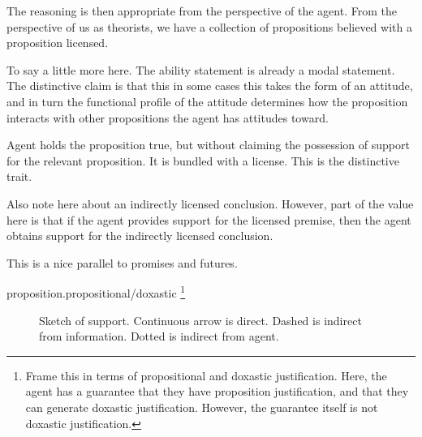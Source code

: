 \documentclass[10pt]{article}
\begin{document}
The reasoning is then appropriate from the perspective of the agent.
From the perspective of us as theorists, we have a collection of propositions believed with a proposition licensed.


To say a little more here.
The ability statement is already a modal statement.
The distinctive claim is that this in some cases this takes the form of an attitude, and in turn the functional profile of the attitude determines how the proposition interacts with other propositions the agent has attitudes toward.


Agent holds the proposition true, but without claiming the possession of support for the relevant proposition.
It is bundled with a license.
This is the distinctive trait.

\begin{note}
  Also note here about an indirectly licensed conclusion.
  However, part of the value here is that if the agent provides support for the licensed premise, then the agent obtains support for the indirectly licensed conclusion.

  This is a nice parallel to promises and futures.
\end{note}



\begin{note}
  proposition.propositional/doxastic\nolinebreak
  \footnote{
    Frame this in terms of propositional and doxastic justification.
    Here, the agent has a guarantee that they have proposition justification, and that they can generate doxastic justification.
    However, the guarantee itself is not doxastic justification. }
\end{note}

\begin{figure}[h]
  \centering
\caption{Sketch of support.
  Continuous arrow is direct.
  Dashed is indirect from information.
  Dotted is indirect from agent.}
\label{fig:dynamics}
\end{figure}
\end{document}
